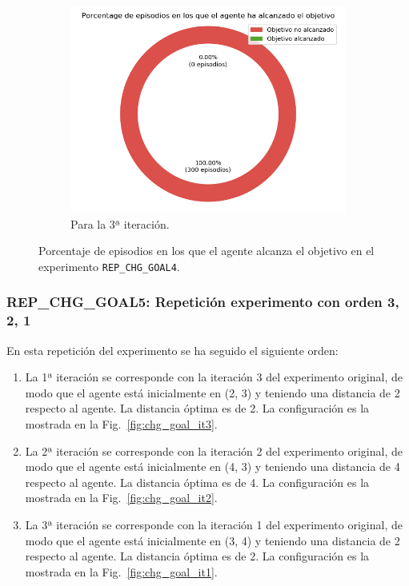 \begin{figure}
\begin{subfigure}{.5\textwidth}
    \end{subfigure}
    \begin{subfigure}{.5\textwidth}
        \centering
        \includegraphics[scale=0.3]{cap5_experimentacion/images/CHANGE_GOAL-20_09-21_47-1, 2, 0_it3_porcentajeResuelto.png}
        \caption{Para la 3ª iteración.}
        \label{fig:CHANGE_GOAL-20_09-22_01-2, 0, 1_it3_porcentajeResuelto}
    \end{subfigure}%
    \caption{Porcentaje de episodios en los que el agente alcanza el objetivo en el experimento \texttt{REP\_CHG\_GOAL4}.}
    \label{fig:CHANGE_GOAL-20_09-22_01-2, 0, 1_porcentajeResuelto}
\end{figure}

\subsubsection{REP\_CHG\_GOAL5: Repetición experimento con orden 3, 2, 1} \label{REP_CHG_GOAL5}

En esta repetición del experimento se ha seguido el siguiente orden: 
\begin{enumerate}
     \item La 1ª iteración se corresponde con la iteración 3 del experimento original, de modo que el agente está inicialmente en (2, 3) y teniendo una distancia de 2 respecto al agente. La distancia óptima es de 2. La configuración es la mostrada en la Fig.~\ref{fig:chg_goal_it3}.
    \item La 2ª iteración se corresponde con la iteración 2 del experimento original, de modo que el agente está inicialmente en (4, 3) y teniendo una distancia de 4 respecto al agente. La distancia óptima es de 4. La configuración es la mostrada en la Fig.~\ref{fig:chg_goal_it2}.
    \item La 3ª iteración se corresponde con la iteración 1 del experimento original, de modo que el agente está inicialmente en (3, 4) y teniendo una distancia de 2 respecto al agente. La distancia óptima es de 2. La configuración es la mostrada en la Fig.~\ref{fig:chg_goal_it1}.
\end{enumerate}
 
